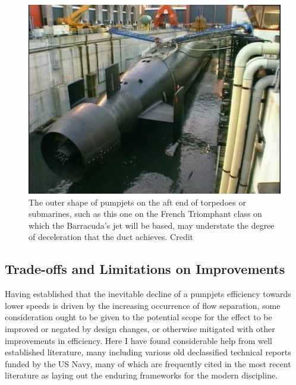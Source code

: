 \documentclass{article}\usepackage[]{graphicx}\usepackage[]{color}
\begin{document}
\begin{figure}
\includegraphics[width=\textwidth]{Triomph.jpg}
\caption{The outer shape of pumpjets on the aft end of torpedoes or submarines, such as this one on the French Triomphant class on which the Barracuda's jet will be based, may understate the degree of deceleration that the duct achieves. Credit \cite{reddit2016}}
\label{fig:Triomph.jpg}
\end{figure}

\subsection{Trade-offs and Limitations on Improvements}

Having established that the inevitable decline of a pumpjets efficiency towards lower speeds is driven by the increasing occurrence of flow separation, some consideration ought to be given to the potential scope for the effect to be improved or negated by design changes, or otherwise mitigated with other improvements in efficiency.  Here I have found considerable help from well established literature, many including various old declassified technical reports funded by the US Navy, many of which are frequently cited in the most recent literature as laying out the enduring frameworks for the modern discipline.
\end{document}
